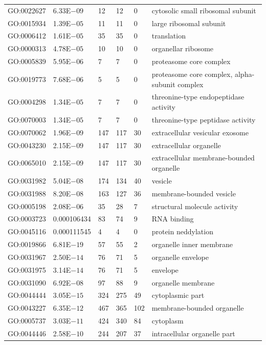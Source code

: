 \begin{appendices}
\begin{longtable}{| p{} | p{} |p{} | p{} |p{} | p{} |}
		GO:0022627 & 6.33E$-09$ & 12 & 12 & 0 & cytosolic small ribosomal subunit \\ 
		GO:0015934 & 1.39E$-05$ & 11 & 11 & 0 & large ribosomal subunit \\ 
		GO:0006412 & 1.61E$-05$ & 35 & 35 & 0 & translation \\ 
		GO:0000313 & 4.78E$-05$ & 10 & 10 & 0 & organellar ribosome \\ 
		GO:0005839 & 5.95E$-06$ & 7 & 7 & 0 & proteasome core complex \\ 
		GO:0019773 & 7.68E$-06$ & 5 & 5 & 0 & proteasome core complex, alpha-subunit complex\\ 
		GO:0004298 & 1.34E$-05$ & 7 & 7 & 0 & threonine-type endopeptidase activity \\ 
		GO:0070003 & 1.34E$-05$ & 7 & 7 & 0 & threonine-type peptidase activity \\ 
		GO:0070062 & 1.96E$-09$ & 147 & 117 & 30 & extracellular vesicular exosome \\ 
		GO:0043230 & 2.15E$-09$ & 147 & 117 & 30 & extracellular organelle \\ 
		GO:0065010 & 2.15E$-09$ & 147 & 117 & 30 & extracellular membrane-bounded organelle \\ 
		GO:0031982 & 5.04E$-08$ & 174 & 134 & 40 & vesicle \\ 
		GO:0031988 & 8.20E$-08$ & 163 & 127 & 36 & membrane-bounded vesicle \\ 
		GO:0005198 & 2.08E$-06$ & 35 & 28 & 7 & structural molecule activity \\ 
		GO:0003723 & 0.000106434 & 83 & 74 & 9 & RNA binding \\ 
		GO:0045116 & 0.000111545 & 4 & 4 & 0 & protein neddylation \\ 
		GO:0019866 & 6.81E$-19$ & 57 & 55 & 2 & organelle inner membrane \\ 
		GO:0031967 & 2.50E$-14$ & 76 & 71 & 5 & organelle envelope \\ 
		GO:0031975 & 3.14E$-14$ & 76 & 71 & 5 & envelope \\ 
		GO:0031090 & 6.92E$-08$ & 97 & 88 & 9 & organelle membrane \\ 
		GO:0044444 & 3.05E$-15$ & 324 & 275 & 49 & cytoplasmic part \\ 
		GO:0043227 & 6.35E$-12$ & 467 & 365 & 102 & membrane-bounded organelle \\ 
		GO:0005737 & 3.03E$-11$ & 424 & 340 & 84 & cytoplasm \\ 
		GO:0044446 & 2.58E$-10$ & 244 & 207 & 37 & intracellular organelle part \\ 

\end{longtable}
\end{appendices}
